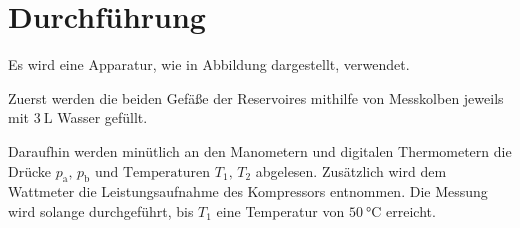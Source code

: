 \section{Durchführung}
\label{sec:Durchführung}

Es wird eine Apparatur, wie in Abbildung  dargestellt, verwendet.

Zuerst werden die beiden Gefäße der Reservoires mithilfe von Messkolben 
jeweils mit $\SI{3}{\liter}$ Wasser gefüllt. 

Daraufhin werden minütlich an den Manometern und digitalen
Thermometern die Drücke $p_\text{a} \text{, } p_\text{b} \text{ und Temperaturen }
T_1 \text{, } T_2$ abgelesen. Zusätzlich wird dem Wattmeter die Leistungsaufnahme 
des Kompressors entnommen. Die Messung wird solange durchgeführt, bis $T_1$ eine
Temperatur von $\SI{50}{\celsius}$ erreicht.
